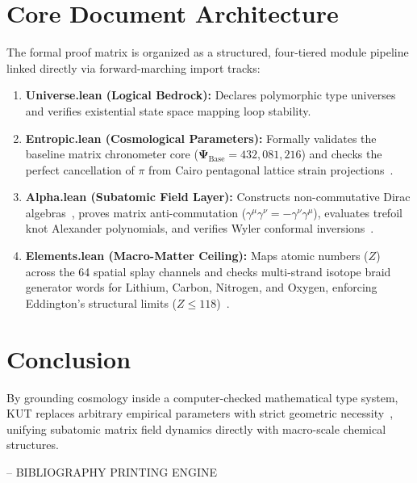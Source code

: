 \documentclass[11pt, memorandum, twoside]{article}
\begin{document}
\section{Core Document Architecture}
The formal proof matrix is organized as a structured, four-tiered module pipeline linked directly via forward-marching import tracks:
\begin{enumerate}
    \item \textbf{Universe.lean (Logical Bedrock):} Declares polymorphic type universes and verifies existential state space mapping loop stability.
    \item \textbf{Entropic.lean (Cosmological Parameters):} Formally validates the baseline matrix chronometer core ($\mathbf{\Psi}_{\text{Base}} = 432,081,216$) and checks the perfect cancellation of $\pi$ from Cairo pentagonal lattice strain projections~\cite{cairo1970pentagonal}.
    \item \textbf{Alpha.lean (Subatomic Field Layer):} Constructs non-commutative Dirac algebras~\cite{connes1994noncommutative}, proves matrix anti-commutation ($\gamma^\mu\gamma^\nu = -\gamma^\nu\gamma^\mu$), evaluates trefoil knot Alexander polynomials, and verifies Wyler conformal inversions~\cite{wyler1971conformal}.
    \item \textbf{Elements.lean (Macro-Matter Ceiling):} Maps atomic numbers ($Z$) across the 64 spatial splay channels and checks multi-strand isotope braid generator words for Lithium, Carbon, Nitrogen, and Oxygen, enforcing Eddington's structural limits ($Z \le 118$)~\cite{eddington1936relativity}.
\end{enumerate}

\section{Conclusion}
By grounding cosmology inside a computer-checked mathematical type system, KUT replaces arbitrary empirical parameters with strict geometric necessity~\cite{mathlib2020lean}, unifying subatomic matrix field dynamics directly with macro-scale chemical structures.

-- BIBLIOGRAPHY PRINTING ENGINE


\end{document}
